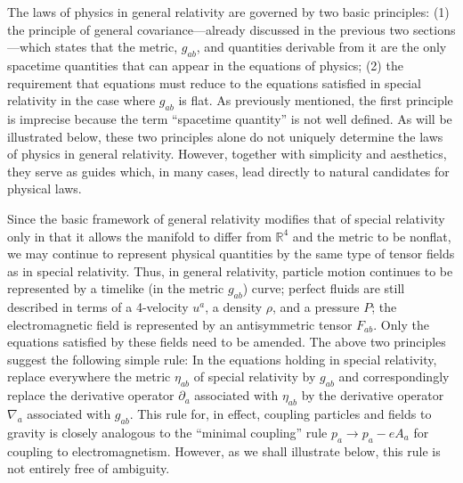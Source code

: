 The laws of physics in general relativity are governed by two basic principles:
(1) the principle of general covariance---already discussed in the previous two
sections---which states that the metric, \(g_{ab}\), and quantities derivable from
it are the only spacetime quantities that can appear in the equations of physics;
(2) the requirement that equations must reduce to the equations satisfied in
special relativity in the case where \(g_{ab}\) is flat. As previously mentioned,
the first principle is imprecise because the term \textquotedblleft spacetime
quantity\textquotedblright{} is not well defined. As will be illustrated below,
these two principles alone do not uniquely determine the laws of physics in general
relativity. However, together with simplicity and aesthetics, they serve as guides
which, in many cases, lead directly to natural candidates for physical laws.

Since the basic framework of general relativity modifies that of special relativity
only in that it allows the manifold to differ from \(\mathbb R^4\) and the metric
to be nonflat, we may continue to represent physical quantities by the same type of
tensor fields as in special relativity. Thus, in general relativity, particle motion
continues to be represented by a timelike (in the metric \(g_{ab}\)) curve; perfect
fluids are still described in terms of a 4-velocity \(u^a\), a density \(\rho\),
and a pressure \(P\); the electromagnetic field is represented by an
antisymmetric tensor \(F_{ab}\). Only the equations satisfied by these fields
need to be amended. The above two principles suggest the following simple rule:
In the equations holding in special relativity, replace everywhere the metric
\(\eta_{ab}\) of special relativity by \(g_{ab}\) and correspondingly replace
the derivative operator \(\partial_a\) associated with \(\eta_{ab}\) by the
derivative operator \(\nabla_a\) associated with \(g_{ab}\). This rule for, in
effect, coupling particles and fields to gravity is closely analogous to the
\textquotedblleft minimal coupling\textquotedblright{} rule
\(p_a\longrightarrow p_a-eA_a\) for coupling to electromagnetism. However,
as we shall illustrate below, this rule is not entirely free of ambiguity.

